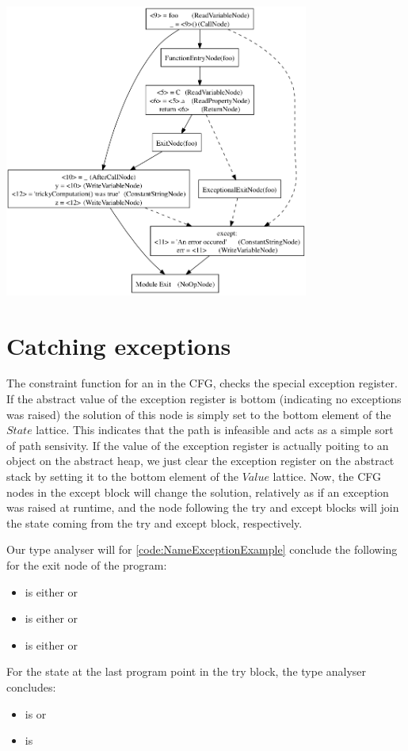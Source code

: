 \begin{listing}[H]
	\begin{center}
		\includegraphics[width=0.75\textwidth]{images/exception1.png}
	\end{center}
	\vspace{-10pt}
\end{listing}


\section{Catching exceptions}
The constraint function for an  in the CFG, checks the special exception register. If the abstract value of the exception register is bottom (indicating no exceptions was raised) the solution of this node is simply set to the bottom element of the $State$ lattice. This indicates that the path is infeasible and acts as a simple sort of path sensivity. If the value of the exception register is actually poiting to an object on the abstract heap, we just clear the exception register on the abstract stack by setting it to the bottom element of the $Value$ lattice. Now, the CFG nodes in the except block will change the solution, relatively as if an exception was raised at runtime, and the node following the try and except blocks will join the state coming from the try and except block, respectively.

Our type analyser will for \autoref{code:NameExceptionExample} conclude the following for the exit node of the program:

\begin{itemize}
	\item {} is either  or 
	\item {} is either  or 
	\item {} is either  or 
\end{itemize}

For the state at the last program point in the try block, the type analyser concludes:

\begin{itemize}
	\item {} is  or 
	\item {} is 
\end{itemize}
